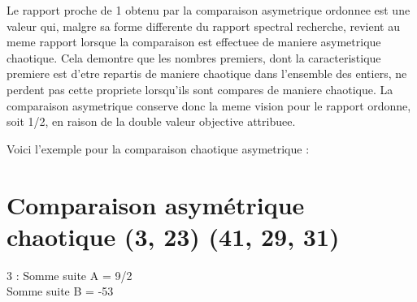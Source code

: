 \documentclass[a4paper,11pt]{article}
\begin{document}
Le rapport proche de 1 obtenu par la comparaison asymetrique ordonnee est une valeur qui, malgre sa forme 
differente du rapport spectral recherche, revient au meme rapport lorsque la comparaison est effectuee de 
maniere asymetrique chaotique. Cela demontre que les nombres premiers, dont la caracteristique premiere est 
d'etre repartis de maniere chaotique dans l'ensemble des entiers, ne perdent pas cette propriete lorsqu'ils 
sont compares de maniere chaotique. La comparaison asymetrique conserve donc la meme vision pour le rapport 
ordonne, soit 1/2, en raison de la double valeur objective attribuee.

Voici l'exemple pour la comparaison chaotique asymetrique :

\section*{Comparaison asymétrique chaotique (3, 23) (41, 29, 31)}

3 : Somme suite A = 9/2 \\
\hspace*{1.5em}Somme suite B = -53 \
\end{document}
